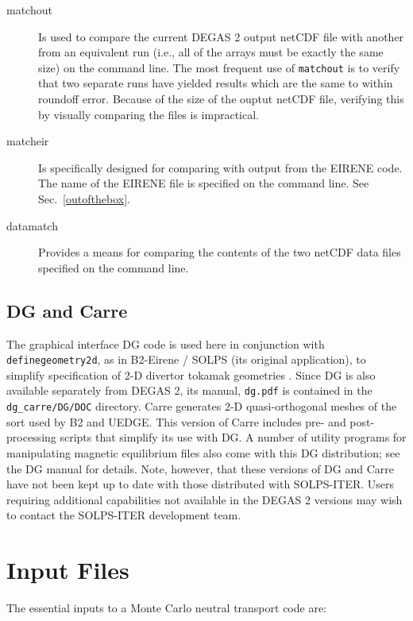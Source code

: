 \documentclass[12pt]{report}
\begin{document}
\begin{description}
\item[matchout] Is used to compare the current DEGAS 2 output netCDF
file with another from an equivalent run (i.e., all of the arrays must
be exactly the same size) on the command line. The most frequent use
of {\tt matchout} is to verify that two separate runs have yielded 
results which are the same to within roundoff error. Because of the size of 
the ouptut netCDF file, verifying this by visually comparing the files 
is impractical.  
\item[matcheir] Is specifically designed for comparing with output from
the EIRENE code. The name of the EIRENE file is specified on the command
line. See Sec.~\ref{outofthebox}.
\item[datamatch] Provides a means for comparing the contents of the two
netCDF data files specified on the command line.
\end{description} 

\subsection{DG and Carre}
\label{dgcarre}

The graphical interface DG code is used here
in conjunction with {\tt definegeometry2d}, as
in B2-Eirene / SOLPS (its original application), to simplify specification of 
2-D divertor tokamak geometries .  Since DG is also available
separately from DEGAS 2, its manual, {\tt dg.pdf} is contained in the
\verb+dg_carre/DG/DOC+ directory.  Carre\cite{Marc96} generates 2-D
quasi-orthogonal meshes of the sort used by B2 and UEDGE. This
version of Carre includes pre- and post-processing scripts that
simplify its use with DG.  A number of utility programs for 
manipulating magnetic equilibrium files also come with this
DG distribution; see the DG manual for details. 
Note, however, that these versions of DG and Carre have not
been kept up to date with those distributed with SOLPS-ITER.
Users requiring additional capabilities not available in
the DEGAS 2 versions may wish to contact the SOLPS-ITER
development team.

\section{Input Files}

The essential inputs to a Monte Carlo neutral transport code are:
\end{document}
